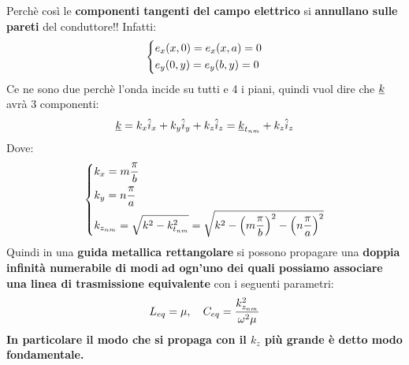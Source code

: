 Perchè così le \textbf{componenti tangenti del campo elettrico} si \textbf{annullano sulle pareti} del conduttore!! Infatti:
\begin{equation*}
    \begin{dcases}
        e_x(x,0) = e_x(x,a) = 0\\
        e_y(0,y) = e_y(b,y) = 0
    \end{dcases}
\end{equation*}
Ce ne sono due perchè l'onda incide su tutti e 4 i piani, quindi vuol dire che $\underline{k}$ avrà 3 componenti:
\begin{equation*}
    \underline{k} = k_x \hat{i}_x + k_y  \hat{i}_y + k_z \hat{i}_z = \underline{k}_{t_{nm}} + k_z \hat{i}_z
\end{equation*}
Dove:
\begin{equation*}
    \begin{dcases}
        k_x = m \frac{\pi}{b}\\
        k_y = n \frac{\pi}{a}\\
        k_{z_{nm}} = \sqrt{k^2 - k^2_{t_{nm}}} = \sqrt{k^2 - \left(m \frac{\pi}{b}\right)^2 - \left(n \frac{\pi}{a}\right)^2}
    \end{dcases}
\end{equation*}
Quindi in una \textbf{guida metallica rettangolare} si possono propagare una \textbf{doppia infinità numerabile di modi} \textbf{ad ogn'uno dei quali possiamo associare una linea di trasmissione equivalente} con i seguenti parametri:
\begin{equation*}
    L_{eq} = \mu, \quad C_{eq}= \frac{k^2_{z_{nm}}}{\omega^2 \mu}
\end{equation*}
\textbf{In particolare il modo che si propaga con il $k_z$ più grande è detto modo fondamentale.}
